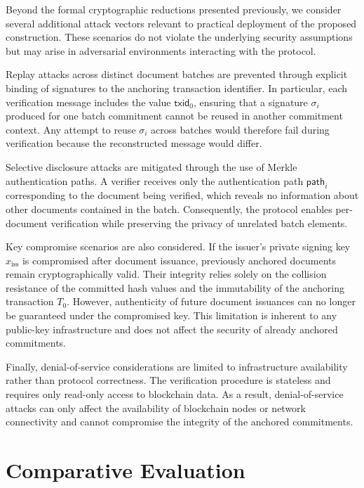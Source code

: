 \documentclass{IEEEoj}
\begin{document}
Beyond the formal cryptographic reductions presented previously, we consider several additional attack vectors relevant to practical deployment of the proposed construction. These scenarios do not violate the underlying security assumptions but may arise in adversarial environments interacting with the protocol.

Replay attacks across distinct document batches are prevented through explicit binding of signatures to the anchoring transaction identifier. In particular, each verification message includes the value $\mathsf{txid}_0$, ensuring that a signature $\sigma_i$ produced for one batch commitment cannot be reused in another commitment context. Any attempt to reuse $\sigma_i$ across batches would therefore fail during verification because the reconstructed message would differ.

Selective disclosure attacks are mitigated through the use of Merkle authentication paths. A verifier receives only the authentication path $\mathsf{path}_i$ corresponding to the document being verified, which reveals no information about other documents contained in the batch. Consequently, the protocol enables per-document verification while preserving the privacy of unrelated batch elements.

Key compromise scenarios are also considered. If the issuer's private signing key $x_{\mathrm{iss}}$ is compromised after document issuance, previously anchored documents remain cryptographically valid. Their integrity relies solely on the collision resistance of the committed hash values and the immutability of the anchoring transaction $T_0$. However, authenticity of future document issuances can no longer be guaranteed under the compromised key. This limitation is inherent to any public-key infrastructure and does not affect the security of already anchored commitments.

Finally, denial-of-service considerations are limited to infrastructure availability rather than protocol correctness. The verification procedure is stateless and requires only read-only access to blockchain data. As a result, denial-of-service attacks can only affect the availability of blockchain nodes or network connectivity and cannot compromise the integrity of the anchored commitments.




\section{Comparative Evaluation}
\label{sec:evaluation}
\end{document}
